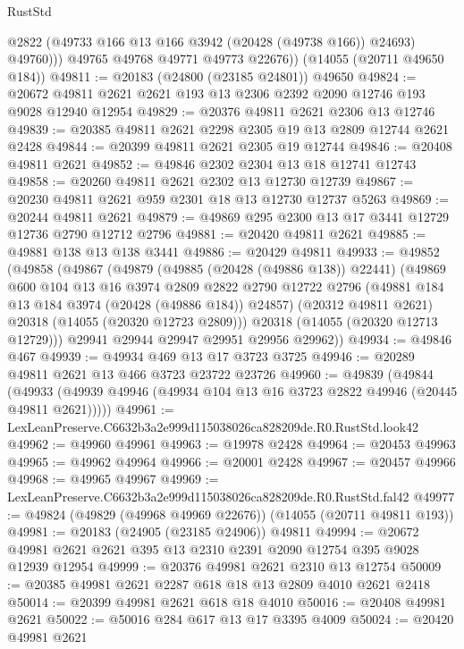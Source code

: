 \begin{lexlean}{RustStd}
\begin{coremodule}
              @2822
              (@49733 @166 @13 @166 @3942 (@20428 (@49738 @166)) @24693)
              @49760)))
        @49765
        @49768
        @49771
        @49773
        @22676))
    (@14055 (@20711 @49650 @184))
@49811 := @20183 (@24800 (@23185 @24801)) @49650
@49824 := @20672 @49811 @2621 @2621 @193 @13 @2306 @2392 @2090 @12746 @193 @9028 @12940 @12954
@49829 := @20376 @49811 @2621 @2306 @13 @12746
@49839 := @20385 @49811 @2621 @2298 @2305 @19 @13 @2809 @12744 @2621 @2428
@49844 := @20399 @49811 @2621 @2305 @19 @12744
@49846 := @20408 @49811 @2621
@49852 := @49846 @2302 @2304 @13 @18 @12741 @12743
@49858 := @20260 @49811 @2621 @2302 @13 @12730 @12739
@49867 := @20230 @49811 @2621 @959 @2301 @18 @13 @12730 @12737 @5263
@49869 := @20244 @49811 @2621
@49879 := @49869 @295 @2300 @13 @17 @3441 @12729 @12736 @2790 @12712 @2796
@49881 := @20420 @49811 @2621
@49885 := @49881 @138 @13 @138 @3441
@49886 := @20429 @49811
@49933 := @49852
    (@49858
      (@49867
        (@49879
          (@49885 (@20428 (@49886 @138)) @22441)
          (@49869
            @600
            @104
            @13
            @16
            @3974
            @2809
            @2822
            @2790
            @12722
            @2796
            (@49881 @184 @13 @184 @3974 (@20428 (@49886 @184)) @24857)
            (@20312 @49811 @2621)
            @20318
            (@14055 (@20320 @12723 @2809)))
          @20318
          (@14055 (@20320 @12713 @12729)))
        @29941
        @29944
        @29947
        @29951
        @29956
        @29962))
@49934 := @49846 @467
@49939 := @49934 @469 @13 @17 @3723 @3725
@49946 := @20289 @49811 @2621 @13 @466 @3723 @23722 @23726
@49960 := @49839
    (@49844 (@49933 (@49939 @49946 (@49934 @104 @13 @16 @3723 @2822 @49946 (@20445 @49811 @2621)))))
@49961 := LexLeanPreserve.C6632b3a2e999d115038026ca828209de.R0.RustStd.look42
@49962 := @49960 @49961
@49963 := @19978 @2428
@49964 := @20453 @49963
@49965 := @49962 @49964
@49966 := @20001 @2428
@49967 := @20457 @49966
@49968 := @49965 @49967
@49969 := LexLeanPreserve.C6632b3a2e999d115038026ca828209de.R0.RustStd.fal42
@49977 := @49824 (@49829 (@49968 @49969 @22676)) (@14055 (@20711 @49811 @193))
@49981 := @20183 (@24905 (@23185 @24906)) @49811
@49994 := @20672 @49981 @2621 @2621 @395 @13 @2310 @2391 @2090 @12754 @395 @9028 @12939 @12954
@49999 := @20376 @49981 @2621 @2310 @13 @12754
@50009 := @20385 @49981 @2621 @2287 @618 @18 @13 @2809 @4010 @2621 @2418
@50014 := @20399 @49981 @2621 @618 @18 @4010
@50016 := @20408 @49981 @2621
@50022 := @50016 @284 @617 @13 @17 @3395 @4009
@50024 := @20420 @49981 @2621

\end{coremodule}
\end{lexlean}
